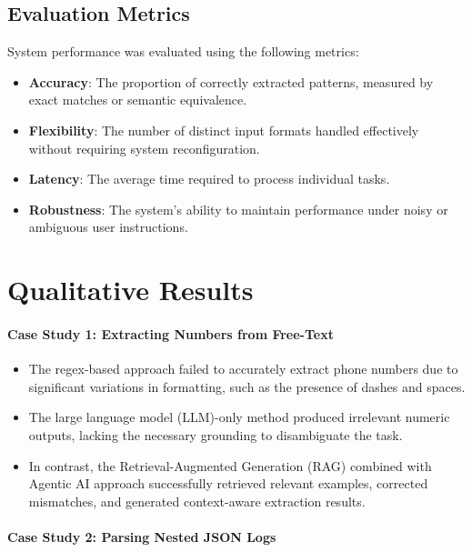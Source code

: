 \subsection{Evaluation Metrics}
System performance was evaluated using the following metrics:
\begin{itemize}
    \item \textbf{Accuracy}: The proportion of correctly extracted patterns, measured by exact matches or semantic equivalence.
    \item \textbf{Flexibility}: The number of distinct input formats handled effectively without requiring system reconfiguration.
    \item \textbf{Latency}: The average time required to process individual tasks.
    \item \textbf{Robustness}: The system's ability to maintain performance under noisy or ambiguous user instructions.
\end{itemize}



\section{Qualitative Results}

\paragraph{Case Study 1: Extracting  Numbers from Free-Text}

\begin{itemize}
    \item The regex-based approach failed to accurately extract phone numbers due to significant variations in formatting, such as the presence of dashes and spaces.
    \item The large language model (LLM)-only method produced irrelevant numeric outputs, lacking the necessary grounding to disambiguate the task.
    \item In contrast, the Retrieval-Augmented Generation (RAG) combined with Agentic AI approach successfully retrieved relevant examples, corrected mismatches, and generated context-aware extraction results.
\end{itemize}


\paragraph{Case Study 2: Parsing Nested JSON Logs}

